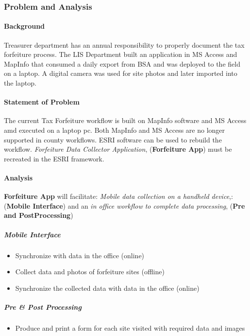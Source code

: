 \documentclass[class=book , crop=false, titlepage, twoside, multi={itemize, figure, verbatim}, float=false]{standalone}
\begin{document}
\subsubsection{Problem and Analysis}
%
\begin{multicols}{2}
\paragraph{Background}
%
\noindent Treasurer department has an annual responsibility to properly document the tax forfeiture process.  The LIS Department built an application in MS Access and MapInfo that consumed a daily export from BSA and was deployed to the field on a laptop.  A digital camera was used for site photos and later imported into the laptop.
%
\paragraph{Statement of Problem}
%
\noindent The current Tax Forfeiture workflow is built on MapInfo software and MS Access amd executed on a laptop pc.  Both MapInfo and MS Access are no longer supported in county workflows.  ESRI software can be used to rebuild the workflow.  \textit{Forfeiture Data Collector Application}, (\textbf{Forfeiture App}) must be recreated in the ESRI framework.
%
\paragraph{Analysis}
%
\noindent \textbf{Forfeiture App} will facilitate: \textit{Mobile data collection on a handheld device},: (\textbf{Mobile Interface}) and an \textit{in office workflow to complete data processing}, (\textbf{Pre and PostProcessing})
%
\subparagraph*{Mobile Interface}
%
\begin{itemize} %
%
\item Synchronize with data in the office (online)
%
\item Collect data and photos of forfeiture sites (offline)
%
\item Synchronize the collected data with data in the office (online)
%
\end{itemize} %
%
\subparagraph*{Pre \& Post Processing}
%
\begin{itemize} %
%
\item Produce and print a form for each site visited with required data and images
%
\end{itemize} %
%
\end{multicols}
%
\clearpage
%
%
%
\end{document}
